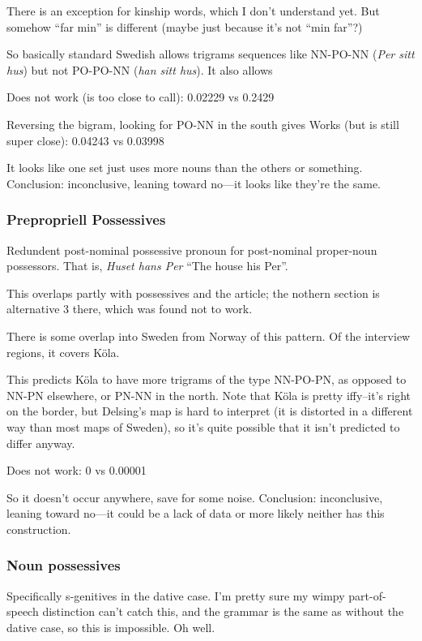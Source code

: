 There is an exception for kinship words, which I don't understand
yet. But somehow ``far min'' is different (maybe just because it's not
``min far''?)

So basically standard Swedish allows trigrams sequences like NN-PO-NN
({\it Per sitt hus}) but not  PO-PO-NN ({\it han sitt hus}). It also
allows

Does not work (is too close to call): 0.02229 vs 0.2429

Reversing the bigram, looking for PO-NN in the south gives
Works (but is still super close): 0.04243 vs 0.03998

It looks like one set just uses more nouns than the others or
something. Conclusion: inconclusive, leaning toward no---it looks like
they're the same.

\subsubsection{Prepropriell Possessives}

Redundent post-nominal possessive pronoun for post-nominal proper-noun
possessors. That is, {\it Huset hans Per} ``The house his Per''.

This overlaps partly with possessives and the article; the nothern
section is alternative 3 there, which was found not to work.

There is some overlap into Sweden from Norway of this pattern. Of the
interview regions, it covers K\"ola.

This predicts K\"ola to have more trigrams of the type NN-PO-PN, as
opposed to NN-PN elsewhere, or PN-NN in the north. Note that K\"ola is
pretty iffy--it's right on the border, but Delsing's map is hard to
interpret (it is distorted in a different way than most maps of
Sweden), so it's quite possible that it isn't predicted to differ anyway.

Does not work: 0 vs 0.00001

So it doesn't occur anywhere, save for some noise. Conclusion:
inconclusive, leaning toward no---it could be a lack of data or more
likely neither has this construction.

\subsubsection{Noun possessives}

Specifically s-genitives in the dative case. I'm pretty sure my wimpy
part-of-speech distinction can't catch this, and the grammar is the
same as without the dative case, so this is impossible. Oh well.

